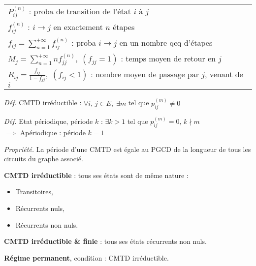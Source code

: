 \documentclass[french]{scrartcl}
\begin{document}
\begin{multicols}{3}
\begin{fleqn}
{\begin{tabularx}{\linewidth}{X}
	$P^{(n)}_{ij}$ : proba de transition de l'état $i$ à $j$\\
	$f_{ij}^{(n)}$ : $i\to j$ en exactement $n$ étapes\\
	$f_{ij} = \sum_{n=1}^{+\infty}f_{ij}^{(n)}$ : proba $i\to j$ en un nombre qcq d'étapes\\
	$M_j=\sum_{n=1}^{+\infty}nf_{jj}^{(n)},\;(f_{jj}=1)$ : temps moyen de retour en $j$\\
	$R_{ij}=\frac{f_{ij}}{1-f_{jj}},\;(f_{ij}<1)$ : nombre moyen de passage par $j$, venant de $i$
\end{tabularx}

\vspace{3pt}
\emph{Déf.} CMTD irréductible : $\forall i,\,j\in E,\;\exists m$ tel que $p^{(m)}_{ij}\ne 0$

\emph{Déf.} Etat périodique, période $k$ : $\exists k>1$ tel que $p_{ij}^{(m)}=0,\,k\nmid m$\\
$\implies$ Apériodique : période $k=1$

\vspace{3pt}
\emph{Propriété.} La période d'une CMTD est égale au PGCD de la longueur de tous les circuits du graphe associé.

\vspace{3pt}
\textbf{CMTD irréductible} : tous ses états sont de même nature :
\begin{itemize}
	\item Transitoires,
	\item Récurrents nuls,
	\item Récurrents non nuls.
\end{itemize}

\vspace{3pt}
\textbf{CMTD irréductible \& finie} : tous ses états récurrents non nuls.

\vspace{3pt}
\textbf{Régime permanent}, condition : CMTD irréductible.

}
\end{fleqn}
\end{multicols}
\end{document}

